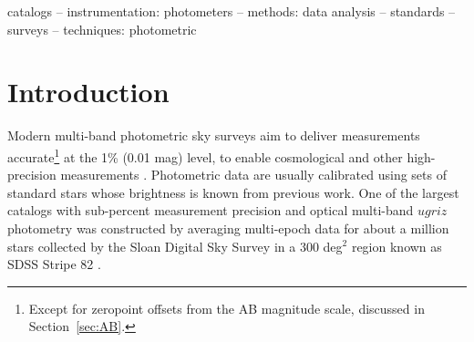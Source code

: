 \documentclass[fleqn,usenatbib]{mnras}
\newcommand{\pO}{\hbox{I007}}
\newcommand{\pOc}{\hbox{I007 catalog}}
\begin{document}
\begin{keywords}
catalogs -- instrumentation: photometers -- methods: data analysis -- standards -- surveys --
techniques: photometric
\end{keywords}



\section{Introduction} \label{sec:intro}

Modern multi-band photometric sky surveys aim to deliver measurements accurate\footnote{Except for zeropoint offsets from the AB magnitude scale, discussed in Section~\ref{sec:AB}.} at the 1\% (0.01 mag) level, to enable cosmological and other high-precision measurements \cite[e.g., the Vera Rubin Observatory Legacy Survey of Space and Time,][]{LSSToverview}. Photometric data are usually calibrated using sets of standard stars whose brightness is known from previous work.
One of the largest catalogs with sub-percent measurement precision and optical multi-band $ugriz$ photometry
was constructed by averaging multi-epoch data for about a million stars collected by the Sloan Digital Sky Survey \citep[SDSS,][]{York2000}  in a 300 deg$^2$ region known as SDSS Stripe 82 \citep[][hereafter \pO]{Ivez07}. 
\end{document}
